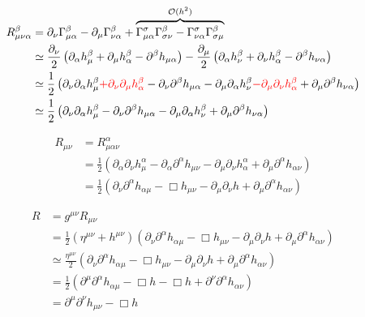 \begin{equation}
    \begin{split}
        R^\beta_{\mu \nu \alpha} &= \partial_\nu \Gamma^\beta_{\mu \alpha} - \partial_\mu \Gamma^\beta_{\nu \alpha} + \overbrace{\Gamma_{\mu \alpha}^\sigma \Gamma_{\sigma \nu}^\beta - \Gamma_{\nu \alpha}^\sigma \Gamma^\beta_{\sigma \mu}}^{\mathcal{O}(h^2)}\\
        &\simeq \frac{\partial_\nu}{2} \left( \partial_\alpha h_\mu^\beta + \partial_\mu h^\beta_\alpha - \partial^\beta h_{\mu \alpha}  \right) - \frac{\partial_\mu}{2} \left( \partial_\alpha h_\nu^\beta + \partial_\nu h^\beta_\alpha - \partial^\beta h_{\nu \alpha} \right)\\
        &\simeq \frac{1}{2} \left( \partial_\nu \partial_\alpha h_\mu^\beta \textcolor{red}{+ \partial_\nu \partial_\mu h^\beta_\alpha} - \partial_\nu \partial^\beta h_{\mu \alpha} - \partial_\mu \partial_\alpha h_\nu^\beta \textcolor{red}{- \partial_\mu \partial_\nu h_\alpha^\beta} + \partial_\mu \partial^\beta h_{\nu \alpha} \right)\\
        &\simeq \frac{1}{2} \left( \partial_\nu \partial_\alpha h_\mu^\beta - \partial_\nu \partial^\beta h_{\mu \alpha} - \partial_\mu \partial_\alpha h_\nu^\beta + \partial_\mu \partial^\beta h_{\nu \alpha} \right)
    \end{split}
\end{equation}

\begin{equation}
    \begin{split}
        R_{\mu\nu} &= R_{\mu \alpha \nu}^\alpha\\
        &= \frac{1}{2} \left( \partial_\alpha \partial_\nu h_\mu^\alpha - \partial_\alpha \partial^\alpha h_{\mu \nu} - \partial_\mu \partial_\nu h_\alpha^\alpha + \partial_\mu \partial^\alpha h_{\alpha \nu} \right)\\
        &= \frac{1}{2} \left( \partial_\nu \partial^\alpha h_{\alpha \mu} - \Box h_{\mu \nu} - \partial_\mu \partial_\nu h + \partial_\mu \partial^\alpha h_{\alpha \nu} \right)
    \end{split}
\end{equation}

\begin{equation}
    \begin{split}
        R &= g^{\mu \nu} R_{\mu \nu}\\
        &= \frac{1}{2} \left( \eta^{\mu \nu} + h^{\mu \nu} \right) \left( \partial_\nu \partial^\alpha h_{\alpha \mu} - \Box h_{\mu \nu} - \partial_\mu \partial_\nu h + \partial_\mu \partial^\alpha h_{\alpha \nu} \right)\\
        &\simeq \frac{\eta^{\mu \nu}}{2} \left( \partial_\nu \partial^\alpha h_{\alpha \mu} - \Box h_{\mu \nu} - \partial_\mu \partial_\nu h + \partial_\mu \partial^\alpha h_{\alpha \nu} \right)\\
        &= \frac{1}{2} \left( \partial^\mu \partial^\alpha h_{\alpha \mu} - \Box h - \Box h + \partial^\nu \partial^\alpha h_{\alpha \nu} \right)\\
        &= \partial^\mu \partial^\nu h_{\mu \nu} - \Box h
    \end{split} 
\end{equation}

